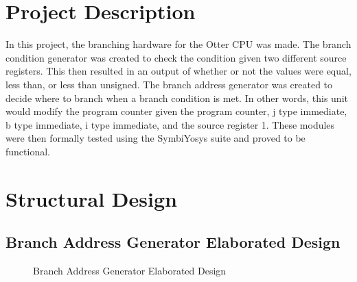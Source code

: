 \documentclass[
    a4paper, %
	12pt, %
    ]{CSSullivanBusinessReport}
\begin{document}
\newpage
\begin{fullwidth} %

\section{Project Description} %

In this project, the branching hardware for the Otter CPU was made. The branch condition generator was created to check the condition given two different source registers. This then resulted in an output of whether or not the values were equal, less than, or less than unsigned. The branch address generator was created to decide where to branch when a branch condition is met. In other words, this unit would modify the program counter given the program counter, j type immediate, b type immediate, i type immediate, and the source register 1. These modules were then formally tested using the SymbiYosys suite and proved to be functional.

\section{Structural Design} %

\subsection{Branch Address Generator Elaborated Design} %

\begin{figure}[H]
    \centering
    \captionsetup{style=widetable}
    \caption{Branch Address Generator Elaborated Design}
    \label{fig:addressDesign}
\end{figure}


\end{fullwidth}
\end{document}
